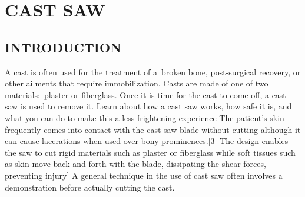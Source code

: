 \documentclass[12pt]{article}
\begin{document}
\tableofcontents


\section{CAST SAW}






\subsection{INTRODUCTION}
A cast is often used for the treatment of a broken bone, post-surgical recovery, or other ailments that require immobilization. Casts are made of one of two materials: plaster or fiberglass. Once it is time for the cast to come off, a cast saw is used to remove it. Learn about how a cast saw works, how safe it is, and what you can do to make this a less frightening experience
The patient's skin frequently comes into contact with the cast saw blade without cutting although it can cause lacerations when used over bony prominences.[3] The design enables the saw to cut rigid materials such as plaster or fiberglass while soft tissues such as skin move back and forth with the blade, dissipating the shear forces, preventing injury] A general technique in the use of cast saw often involves a demonstration before actually cutting the cast.
\end{document}
